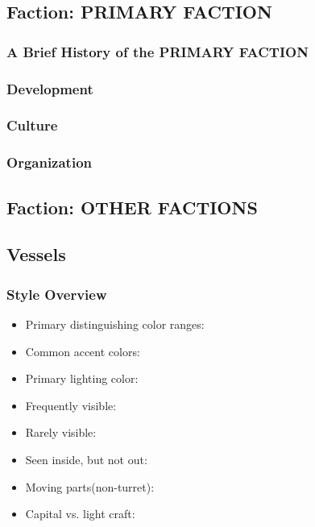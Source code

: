 \subsection{Faction: PRIMARY FACTION}


\subsubsection{A Brief History of the PRIMARY FACTION}


\subsubsection{Development}

\subsubsection{Culture}

\subsubsection{Organization}

\subsection{Faction: OTHER FACTIONS}



\subsection{Vessels}

\subsubsection{Style Overview}
\begin{itemize}

\item Primary distinguishing color ranges: 

\item Common accent colors:

\item Primary lighting color:

\item Frequently visible: 

\item Rarely visible:

\item Seen inside, but not out: 

\item Moving parts(non-turret): 

\item Capital vs. light craft: 

\end{itemize}

